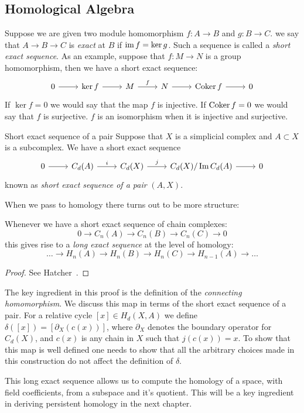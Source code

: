 \subsection{Homological Algebra} 
Suppose we are given two module homomorphism $f: A \rightarrow B$ and $g: B \rightarrow C$. we say that $A \rightarrow B \rightarrow C$
is \emph{exact} at $B$ if $\operatorname{im}{f} =  \ker{g}$. Such a sequence is called a \emph{short exact sequence}. As an example, suppose that $f: M \rightarrow N$ is a group homomorphism, then we have a short exact sequence:
\[ 
\begin{tikzcd}
0 \arrow{r} & \ker{f} \arrow{r} & M \arrow{r}{f} & N \arrow{r} & \coker{f} \arrow{r}& 0
\end{tikzcd}
\] 
If $\ker{f} = 0$ we would say that the map $f$ is injective. If $\operatorname{Coker}{f} = 0$ we would say that $f$ is surjective. $f$ is an isomorphism when it is injective and surjective. 
\begin{definition}{Short exact sequence of a pair}
Suppose that $X$ is a simplicial complex and $A \subset X$ is a subcomplex. We have a short exact sequence 
\[
\begin{tikzcd}
0 \arrow{r}& C_d(A) \arrow{r}{i} & C_d(X) \arrow{r}{j} & C_d(X)/\Im{C_d(A)} \arrow{r} & 0 
\end{tikzcd}
\]
known as \emph{short exact sequence of a pair} $(A,X)$.
\end{definition}
When we pass to homology there turns out to be more structure:
\begin{theorem} 
Whenever we have a short exact sequence of chain complexes: 
\[  0 \rightarrow C_n(A) \rightarrow C_n(B) \rightarrow C_n(C) \rightarrow 0 \]
this gives rise to a \emph{long exact sequence} at the level of homology:
\[ \ldots \rightarrow H_n(A) \rightarrow H_n(B) \rightarrow H_n(C) \rightarrow H_{n-1}(A) \rightarrow \ldots  \]  
\end{theorem}
\begin{proof}
See Hatcher~\cite{hatcher}.
\end{proof}
The key ingredient in this proof is the definition of the \emph{connecting homomorphism}. We discuss this map in terms of the short exact sequence of a pair. For a relative cycle $[x] \in H_d(X,A)$ we define $\delta([x]) = [\partial_X(c(x))]$, where $\partial_X$ denotes the boundary operator for $C_d(X)$, and $c(x)$ is any chain in $X$ such that $j(c(x)) = x$. To show that this map is well defined one needs to show that all the arbitrary choices made in this construction do not affect the definition of $\delta$. 
 
This long exact sequence allows us to compute the homology of a space, with field coefficients, from a subspace and it's quotient. This will be a key ingredient in deriving persistent homology in the next chapter.